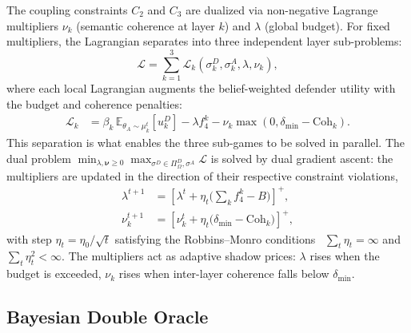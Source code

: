 \documentclass[conference]{IEEEtran}
\newcommand{\E}{\mathbb{E}}
\newcommand{\Coh}{\mathrm{Coh}}
\begin{document}
The coupling constraints $C_2$ and $C_3$ are dualized via non-negative Lagrange
multipliers $\nu_k$ (semantic coherence at layer $k$) and $\lambda$ (global
budget). For fixed multipliers, the Lagrangian separates into three independent
layer sub-problems:
\begin{equation}
\mathcal{L} = \sum_{k=1}^3 \mathcal{L}_k(\sigma_k^D,\sigma_k^A,\lambda,\nu_k),
\label{eq:lagrangian}
\end{equation}
where each local Lagrangian augments the belief-weighted defender utility with
the budget and coherence penalties:
\begin{align}
\mathcal{L}_k &= \beta_k\,\E_{\theta_A\sim\mu_k^t}\!\left[u_k^D\right]
- \lambda f_4^k
- \nu_k\max\!\left(0, \delta_{\min}-\Coh_k\right).
\end{align}
This separation is what enables the three sub-games to be solved in parallel.
The dual problem
$\min_{\lambda,\boldsymbol{\nu}\geq0}\max_{\sigma^D\in\Pi^D_\Omega,\sigma^A}
\mathcal{L}$ is solved by dual gradient ascent: the multipliers are updated in
the direction of their respective constraint violations,
\begin{align}
\lambda^{t+1} &= \left[\lambda^t + \eta_t\Big(\textstyle\sum_k f_4^k - B\Big)
\right]^+,\\
\nu_k^{t+1} &= \left[\nu_k^t + \eta_t\big(\delta_{\min}-\Coh_k\big)\right]^+,
\end{align}
with step $\eta_t=\eta_0/\sqrt{t}$ satisfying the Robbins--Monro
conditions~\cite{robbins1951}
$\sum_t\eta_t=\infty$ and $\sum_t\eta_t^2<\infty$. The multipliers act as
adaptive shadow prices: $\lambda$ rises when the budget is exceeded, $\nu_k$
rises when inter-layer coherence falls below $\delta_{\min}$.

\subsection{Bayesian Double Oracle}
\end{document}

